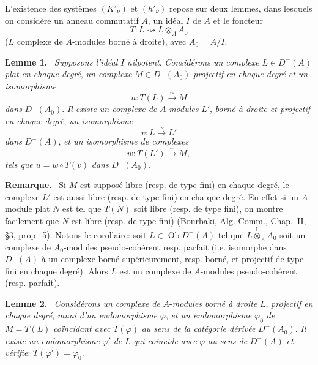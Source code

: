 \documentclass[11pt]{article}
\newenvironment{statement}[1]{\par\medskip\noindent\textbf{#1.}\ }{\par\medskip}
\begin{document}
L'existence des systèmes $(K'_\nu)$ et $(h'_\nu)$ repose sur deux lemmes, dans lesquels on considère un anneau commutatif $A$, un idéal $I$ de $A$ et le foncteur
\[
T:L\rightsquigarrow L\otimes_A A_0
\]
($L$ complexe de $A$-modules borné à droite), avec $A_0=A/I$.

\begin{statement}{Lemme 1}
\emph{Supposons l'idéal} $I$ \emph{nilpotent}. \emph{Considérons un complexe} $L\in D^-(A)$ \emph{plat en chaque degré}, \emph{un complexe} $M\in D^-(A_0)$ \emph{projectif en chaque degré et un isomorphisme}
\[
u:T(L)\xrightarrow{\sim}M
\]
\emph{dans} $D^-(A_0)$. \emph{Il existe un complexe de} $A$-\emph{modules} $L'$, \emph{borné à droite et projectif en chaque degré}, \emph{un isomorphisme}
\[
v:L\xrightarrow{\sim}L'
\]
\emph{dans} $D^-(A)$, \emph{et un isomorphisme de complexes}
\[
w:T(L')\xrightarrow{\sim}M,
\]
\emph{tels que} $u=w\circ T(v)$ \emph{dans} $D^-(A_0)$.
\end{statement}

\begin{statement}{Remarque}
Si $M$ est supposé libre (resp. de type fini) en chaque degré, le complexe $L'$ est aussi libre (resp. de type fini) en cha%
que
degré. En effet si un $A$-module plat $N$ est tel que $T(N)$ soit libre (resp. de type fini), on montre facilement que $N$ est libre (resp. de type fini) (Bourbaki, Alg. Comm., Chap.~II, §3, prop.~5). Notons le corollaire: soit $L\in\operatorname{Ob} D^-(A)$ tel que $L\overset{\mathbb L}{\otimes}_A A_0$ soit un complexe de $A_0$-modules pseudo-cohérent resp. parfait (i.e. isomorphe dans $D^-(A)$ à un complexe borné supérieurement, resp. borné, et projectif de type fini en chaque degré). Alors $L$ est un complexe de $A$-modules pseudo-cohérent (resp. parfait).
\end{statement}

\begin{statement}{Lemme 2}
\emph{Considérons un complexe de} $A$-\emph{modules borné à droite} $L$, \emph{projectif en chaque degré}, \emph{muni d'un endomorphisme} $\varphi$, \emph{et un endomorphisme} $\varphi_0$ \emph{de} $M=T(L)$ \emph{coïncidant avec} $T(\varphi)$ \emph{au sens de la catégorie dérivée} $D^-(A_0)$. \emph{Il existe un endomorphisme} $\varphi'$ \emph{de} $L$ \emph{qui coïncide avec} $\varphi$ \emph{au sens de} $D^-(A)$ \emph{et vérifie}: $T(\varphi')=\varphi_0$.
\end{statement}
\end{document}
